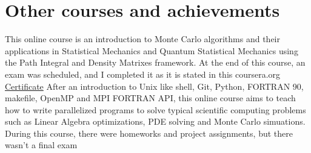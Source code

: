 \documentclass[11pt,a4paper]{moderncv}
\begin{document}
\section{Other courses and achievements}
{\small This online course is an introduction to Monte Carlo algorithms and their applications in Statistical Mechanics and Quantum Statistical Mechanics using the Path Integral and Density Matrixes framework. At the end of this course, an exam was scheduled, and I completed it as it is stated in this coursera.org \textcolor{blue}{\href{http://dgiannelli.github.io/coursera_smac.pdf}{Certificate}}}
{\small After an introduction to Unix like shell, Git, Python, FORTRAN 90, makefile, OpenMP and MPI FORTRAN API, this online course aims to teach how to write parallelized programs to solve typical scientific computing problems such as Linear Algebra optimizations, PDE solving and Monte Carlo simuations. During this course, there were homeworks and project assignments, but there wasn't a final exam}
\end{document}
